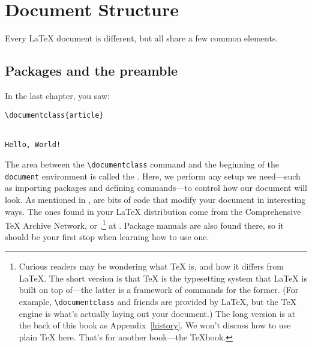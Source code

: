 \chapter{Document Structure}
\label{structure}

Every \LaTeX{} document is different,
but all share a few common elements.

\section{Packages and the preamble}
In the last chapter, you saw:
\begin{leftfigure}
\begin{lstlisting}
\documentclass{article}


Hello, World!

\end{lstlisting}
\end{leftfigure}
The area between the \verb|\documentclass| command and the beginning of the
\texttt{document} environment is called the .
Here, we perform any setup we need---such as importing packages
and defining commands---to control how our document
will look.
As mentioned in ,
 are bits of code that modify your document
in interesting ways.
The ones found in your \LaTeX{} distribution come from the Comprehensive \TeX{}
Archive Network, or ,\punckern\footnote{Curious readers may
be wondering what \TeX{} is, and how it differs from \LaTeX.
The short version is that \TeX{} is the typesetting system that \LaTeX{}
is built on top of---the latter is a framework of commands for the former.
(For example, \texttt{\textbackslash documentclass} and friends are provided by
\LaTeX{}, but the \TeX{} engine is what's actually laying out your document.)
The long version is at the back of this book as Appendix~\ref{history}.
We won't discuss how to use plain \TeX{} here. That's for another book---the
\TeX book.}
at .
Package manuals are also found there,
so it should be your first stop when learning how to use one.

